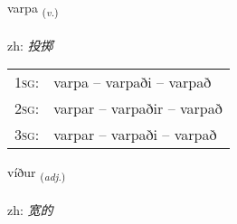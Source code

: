 \documentclass[frontgrid, backgrid]{flacards}\usepackage[]{graphicx}\usepackage[]{color}
\begin{document}
\renewcommand{\flhead}{\vskip5pt \fboxsep=0pt {\small\bfseries\footnotesize Sagnorð | 动词}}
\renewcommand{\fcfoot}{\vskip5pt \fboxsep=0pt \hspace{2pt}{\small\bfseries\footnotesize 2K}}

\renewcommand{\blhead}{\vskip5pt {\small\bfseries\footnotesize Sagnorð | 动词 }}
\renewcommand{\bcfoot}{\vskip5pt \hspace{2pt}{\small\bfseries\footnotesize 2K}}


{varpa \small{\textsubscript{(\textit{v.})}} \\[1ex] %
\textphonetic{[var̥pa]} \\
zh: \emph{投掷} \\  [2ex]
\renewcommand*{\arraystretch}{0.8}
\begin{tabular}{p{1cm}l}
\textsc{1sg}: & varpa -- varpaði -- varpað \\ 
\textsc{2sg}: & varpar -- varpaðir -- varpað \\ 
\textsc{3sg}: & varpar -- varpaði -- varpað \\ 
\end{tabular}
}

\renewcommand{\flhead}{\vskip5pt \fboxsep=0pt {\small\bfseries\footnotesize Lýsingarorð | 形容词}}
\renewcommand{\fcfoot}{\vskip5pt \fboxsep=0pt \hspace{2pt}{\small\bfseries\footnotesize 2K}}

\renewcommand{\blhead}{\vskip5pt {\small\bfseries\footnotesize Lýsingarorð | 形容词 }}
\renewcommand{\bcfoot}{\vskip5pt \hspace{2pt}{\small\bfseries\footnotesize 2K}}


{víður \small{\textsubscript{(\textit{adj.})}} \\[1ex] %
\textphonetic{[viːðʏr]} \\
zh: \emph{宽的} \\  [2ex]
\renewcommand*{\arraystretch}{0.8}
}
\end{document}
